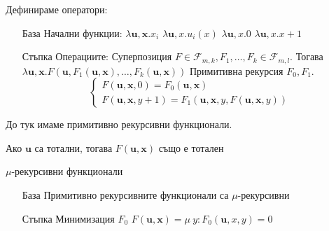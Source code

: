 \begin{definition}
    Дефинираме оператори:
    \begin{itemize}
        \item[База] Начални функции: 
            \subitem $\lambda \textbf{u},\textbf{x}. x_i$
            \subitem $\lambda \textbf{u}, x. u_i(x)$
            \subitem $\lambda \textbf{u}, x. 0$
            \subitem $\lambda \textbf{u}, x. x+1$
        \item[Стъпка] Операциите:
            \subitem Суперпозиция $F \in \mathcal F_{m,k}, F_1, \dots, F_k \in \mathcal F_{m,l}$. Тогава $\lambda \textbf{u}, \textbf{x}. F(\textbf{u}, F_1(\textbf{u}, \textbf{x}), \dots, F_k(\textbf{u}, \textbf{x}))$
            \subitem Примитивна рекурсия $F_0, F_1$. 
            \begin{equation*}
                \begin{cases}
                    F(\textbf{u}, \textbf{x}, 0) = F_0(\textbf{u}, \textbf{x}) \\
                    F(\textbf{u}, \textbf{x}, y+1) = F_1(\textbf{u}, \textbf{x}, y, F(\textbf{u}, \textbf{x}, y))
                \end{cases}
            \end{equation*}
    \end{itemize}
    До тук имаме примитивно рекурсивни функционали. 
    
    Ако $\textbf{u}$ са тотални, тогава $F(\textbf{u}, \textbf{x})$ също е тотален
\end{definition}

\begin{definition}
    $\mu$-рекурсивни функционали
    \begin{itemize}
        \item[База] Примитивно рекурсивните функционали са $\mu$-рекурсивни
        \item[Стъпка] Минимизация $F_0$
            \subitem $F(\textbf{u}, \textbf{x}) = \mu\ y: F_0(\textbf{u}, x, y) = 0$
    \end{itemize}
\end{definition}

